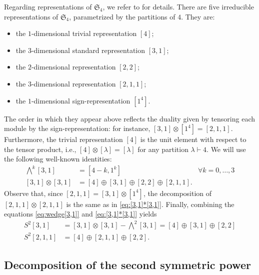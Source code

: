\documentclass[11pt,reqno]{amsart}
\theoremstyle{definition}
\numberwithin{theorem}{section}
\numberwithin{equation}{section}
\begin{document}
\indent Regarding representations of $\mathfrak{S}_4$, we refer to \cite[Section 2.3]{fulton2013representation} for details. There are five irreducible representations of $\mathfrak{S}_4$, parametrized by the partitions of $4$. They are:
\begin{itemize}
\item the $1$-dimensional trivial representation $[4]$;
\item the $3$-dimensional standard representation $[3,1]$;
\item the $2$-dimensional representation $[2,2]$;
\item the $3$-dimensional representation $[2,1,1]$;
\item the $1$-dimensional sign-representation $[1^4]$.
\end{itemize}
\noindent The order in which they appear above reflects the duality given by tensoring each module by the sign-representation: for instance, $[3,1] \otimes [1^4]=[2,1,1]$. Furthermore, the trivial representation $[4]$ is the unit element with respect to the tensor product, i.e., $[4]\otimes [\lambda] = [\lambda]$ for any partition $\lambda \vdash 4$. We will use the following well-known identities:
\begin{align}
{\textstyle \bigwedge^k}[3,1] & = [4-k,1^k] & \forall k=0,\ldots, 3 \label{eq:wedge[3,1]} \\
[3,1] \otimes [3,1] & = [4] \oplus [3,1] \oplus [2,2] \oplus [2,1,1] .\label{eq:[3,1]*[3,1]}
\end{align}
Observe that, since $[2,1,1] = [3,1] \otimes [1^4]$, the decomposition of $[2,1,1]\otimes [2,1,1]$ is the same as in \eqref{eq:[3,1]*[3,1]}. Finally, combining the equations \eqref{eq:wedge[3,1]} and \eqref{eq:[3,1]*[3,1]} yields
\begin{align}\label{eq:sym[3,1]}
S^2[3,1] & = [3,1]\otimes [3,1] - {\textstyle \bigwedge^2}[3,1] = [4] \oplus [3,1] \oplus [2,2] \nonumber \\
S^2[2,1,1] & = [4] \oplus [2,1,1] \oplus [2,2] .
\end{align}



\subsection{Decomposition of the second symmetric power}\label{subsec: decomposition}
\end{document}
